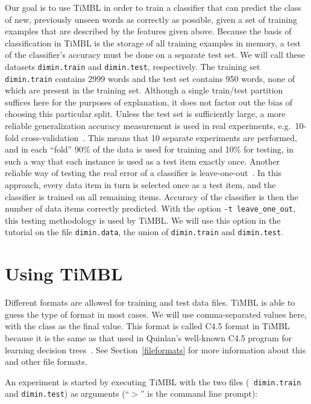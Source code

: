 \documentclass{book}
\begin{document}
Our goal is to use TiMBL in order to train a classifier that can
predict the class of new, previously unseen words as correctly as
possible, given a set of training examples that are described by the
features given above. Because the basis of classification in TiMBL is
the storage of all training examples in memory, a test of the
classifier's accuracy must be done on a separate test set. We will
call these datasets {\tt dimin.train} and {\tt dimin.test},
respectively. The training set {\tt dimin.train} contains 2999 words
and the test set contains 950 words, none of which are present in the
training set. Although a single train/test partition suffices here for
the purposes of explanation, it does not factor out the bias of
choosing this particular split. Unless the test set is sufficiently
large, a more reliable generalization accuracy measurement is used in
real experiments, e.g.~10-fold cross-validation~\cite{Weiss+91}. This
means that 10 separate experiments are performed, and in each ``fold''
90\% of the data is used for training and 10\% for testing, in such a
way that each instance is used as a test item exactly once. Another
reliable way of testing the real error of a classifier is
leave-one-out~\cite{Weiss+91}. In this approach, every data item in
turn is selected once as a test item, and the classifier is trained on
all remaining items. Accuracy of the classifier is then the number of
data items correctly predicted. With the option {\tt -t
leave\_one\_out}, this testing methodology is used by TiMBL. We
will use this option in the tutorial on the file {\tt dimin.data}, the
union of {\tt dimin.train} and {\tt dimin.test}.

\section{Using TiMBL}

Different formats are allowed for training and test data files. TiMBL
is able to guess the type of format in most cases. We will use
comma-separated values here, with the class as the final value. This
format is called C4.5 format in TiMBL because it is the same as that
used in Quinlan's well-known C4.5 program for learning decision
trees~\cite{Quinlan93}. See Section~\ref{fileformats} for more
information about this and other file formats.

An experiment is started by executing TiMBL with the two files ({\tt
  dimin.train} and {\tt dimin.test}) as arguments (``$>$'' is the
command line prompt):
\end{document}
